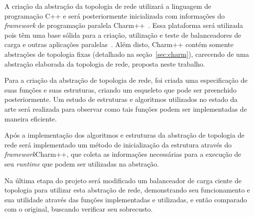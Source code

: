 \documentclass[
	12pt,				%
	openright,			%
	twoside,			%
	a4paper,			%
	english,			%
	brazil,				%
	]{abntex2}
\newcommand{\fw}{\textit{framework}\xspace}
\newcommand{\charm}{{{Charm++}}\xspace}
\begin{document}
A criação da abstração da topologia de rede utilizará a linguagem de programação C++ e será posteriormente inicializada com informações do \fw de programação paralela \charm~\cite{website:CHARM}. Essa plataforma será utilizada pois têm uma base sólida para a criação, utilização e teste de balanceadores de carga e outras aplicações paralelas~\cite{bhatele-thesis}. Além disto, \charm contém somente abstrações de topologia fixas (detalhado na seção~\ref{sec:charm}), carecendo de uma abstração elaborada da topologia de rede, proposta neste trabalho.

Para a criação da abstração de topologia de rede, foi criada uma especificação de suas funções e suas estruturas, criando um esqueleto que pode ser preenchido posteriormente. Um estudo de estruturas e algoritmos utilizados no estado da arte será realizada para observar como tais funções podem ser implementadas de maneira eficiente.

Após a implementação dos algoritmos e estruturas da abstração de topologia de rede será implementado um método de inicialização da estrutura através do \fw \xspace \charm, que coleta as informações necessárias para a execução de seu \textit{runtime} que podem ser utilizadas na abstração.

Na última etapa do projeto será modificado um balanceador de carga ciente de topologia para utilizar esta abstração de rede, demonstrando seu funcionamento e sua utilidade através das funções implementadas e utilizadas, e então comparado com o original, buscando verificar seu sobrecusto.




\end{document}
